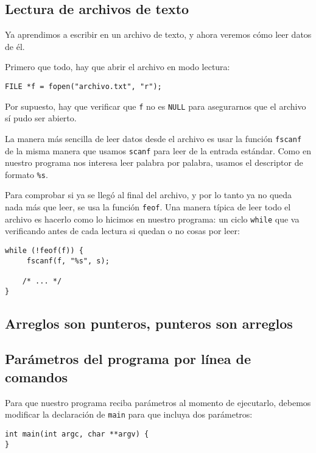 \subsection{Lectura de archivos de texto}

Ya aprendimos a escribir en un archivo de texto, y ahora veremos cómo
leer datos de él.

Primero que todo, hay que abrir el archivo en modo lectura:

\begin{lstlisting}
FILE *f = fopen("archivo.txt", "r");
\end{lstlisting}

Por supuesto, hay que verificar que \lstinline!f! no es \lstinline!NULL!
para asegurarnos que el archivo sí pudo ser abierto.

La manera más sencilla de leer datos desde el archivo es usar la función
\lstinline!fscanf! de la misma manera que usamos \lstinline!scanf! para
leer de la entrada estándar. Como en nuestro programa nos interesa leer
palabra por palabra, usamos el descriptor de formato \lstinline!%s!.

Para comprobar si ya se llegó al final del archivo, y por lo tanto ya no
queda nada más que leer, se usa la función \lstinline!feof!. Una manera
típica de leer todo el archivo es hacerlo como lo hicimos en nuestro
programa: un ciclo \lstinline!while! que va verificando antes de cada
lectura si quedan o no cosas por leer:

\begin{lstlisting}
while (!feof(f)) {
     fscanf(f, "%s", s);

    /* ... */
}
\end{lstlisting}

\subsection{Arreglos son punteros, punteros son arreglos}

\subsection{Parámetros del programa por línea de comandos}

Para que nuestro programa reciba parámetros al momento de ejecutarlo,
debemos modificar la declaración de \lstinline!main! para que incluya
dos parámetros:

\begin{lstlisting}
int main(int argc, char **argv) {
}
\end{lstlisting}

